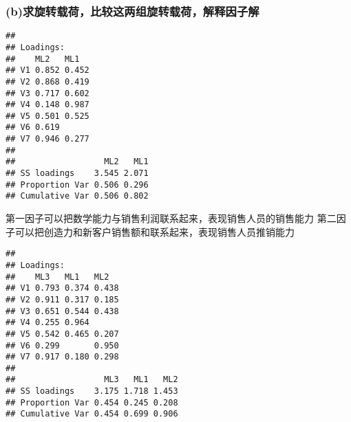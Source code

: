 \documentclass[
]{article}
\newenvironment{Shaded}{\begin{snugshade}}{\end{snugshade}}
\newcommand{\DataTypeTok}[1]{\textcolor[rgb]{0.13,0.29,0.53}{#1}}
\newcommand{\DecValTok}[1]{\textcolor[rgb]{0.00,0.00,0.81}{#1}}
\newcommand{\KeywordTok}[1]{\textcolor[rgb]{0.13,0.29,0.53}{\textbf{#1}}}
\newcommand{\NormalTok}[1]{#1}
\newcommand{\OperatorTok}[1]{\textcolor[rgb]{0.81,0.36,0.00}{\textbf{#1}}}
\newcommand{\StringTok}[1]{\textcolor[rgb]{0.31,0.60,0.02}{#1}}
\begin{document}
\hypertarget{bux6c42ux65cbux8f6cux8f7dux8377ux6bd4ux8f83ux8fd9ux4e24ux7ec4ux65cbux8f6cux8f7dux8377ux89e3ux91caux56e0ux5b50ux89e3}{%
\subsubsection{(b)求旋转载荷，比较这两组旋转载荷，解释因子解}\label{bux6c42ux65cbux8f6cux8f7dux8377ux6bd4ux8f83ux8fd9ux4e24ux7ec4ux65cbux8f6cux8f7dux8377ux89e3ux91caux56e0ux5b50ux89e3}}

\begin{Shaded}
\end{Shaded}

\begin{verbatim}
## 
## Loadings:
##    ML2   ML1  
## V1 0.852 0.452
## V2 0.868 0.419
## V3 0.717 0.602
## V4 0.148 0.987
## V5 0.501 0.525
## V6 0.619      
## V7 0.946 0.277
## 
##                  ML2   ML1
## SS loadings    3.545 2.071
## Proportion Var 0.506 0.296
## Cumulative Var 0.506 0.802
\end{verbatim}

第一因子可以把数学能力与销售利润联系起来，表现销售人员的销售能力
第二因子可以把创造力和新客户销售额和联系起来，表现销售人员推销能力

\begin{Shaded}
\end{Shaded}

\begin{verbatim}
## 
## Loadings:
##    ML3   ML1   ML2  
## V1 0.793 0.374 0.438
## V2 0.911 0.317 0.185
## V3 0.651 0.544 0.438
## V4 0.255 0.964      
## V5 0.542 0.465 0.207
## V6 0.299       0.950
## V7 0.917 0.180 0.298
## 
##                  ML3   ML1   ML2
## SS loadings    3.175 1.718 1.453
## Proportion Var 0.454 0.245 0.208
## Cumulative Var 0.454 0.699 0.906
\end{verbatim}
\end{document}
